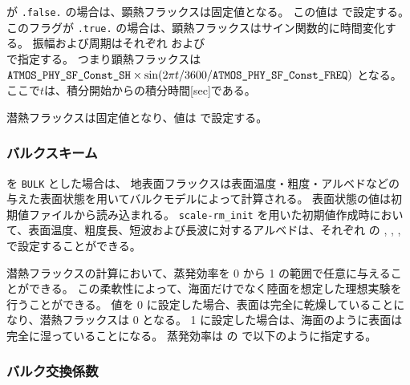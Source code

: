  が \verb|.false.| の場合は、顕熱フラックスは固定値となる。
この値は  で設定する。
このフラグが \verb|.true.| の場合は、顕熱フラックスはサイン関数的に時間変化する。
振幅および周期はそれぞれ  および \\  で指定する。
つまり顕熱フラックスは \\
$\nmitemeq{ATMOS_PHY_SF_Const_SH} \times \sin(2\pi t/3600/\nmitemeq{ATMOS_PHY_SF_Const_FREQ})$ となる。
ここで$t$は、積分開始からの積分時間[sec]である。

潜熱フラックスは固定値となり、値は  で設定する。


\subsubsection{バルクスキーム}
 を \verb|BULK| とした場合は、
地表面フラックスは表面温度・粗度・アルベドなどの与えた表面状態を用いてバルクモデルによって計算される。
表面状態の値は初期値ファイルから読み込まれる。
\verb|scale-rm_init| を用いた初期値作成時において、表面温度、粗度長、短波および長波に対するアルベドは、それぞれ  の , , , \\  で設定することができる。

潜熱フラックスの計算において、蒸発効率を 0 から 1 の範囲で任意に与えることができる。
この柔軟性によって、海面だけでなく陸面を想定した理想実験を行うことができる。
値を 0 に設定した場合、表面は完全に乾燥していることになり、潜熱フラックスは 0 となる。
1 に設定した場合は、海面のように表面は完全に湿っていることになる。
蒸発効率は  の  で以下のように指定する。
%



\subsubsection{バルク交換係数}


